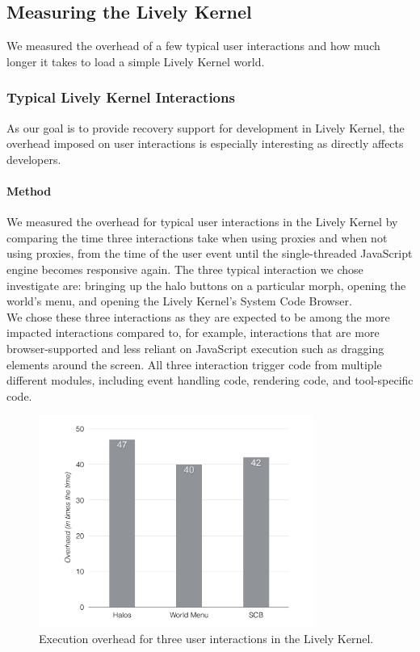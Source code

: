 \subsection{Measuring the Lively Kernel}

We measured the overhead of a few typical user interactions and how much longer it takes to load a simple Lively Kernel world.

\subsubsection{Typical Lively Kernel Interactions}

As our goal is to provide recovery support for development in Lively Kernel, the overhead imposed on user interactions is especially interesting as directly affects developers.

\paragraph{Method}
We measured the overhead for typical user interactions in the Lively Kernel by comparing the time three interactions take when using proxies and when not using proxies, from the time of the user event until the single-threaded JavaScript engine becomes responsive again.
The three typical interaction we chose investigate are: bringing up the halo buttons on a particular morph, opening the world's menu, and opening the Lively Kernel's System Code Browser.\\
We chose these three interactions as they are expected to be among the more impacted interactions compared to, for example, interactions that are more browser-supported and less reliant on JavaScript execution such as dragging elements around the screen.
All three interaction trigger code from multiple different modules, including event handling code, rendering code, and tool-specific code.

\begin{figure}[h]
    \centering
    \includegraphics[width=0.8\textwidth]{figures/6_evaluation/4_LivelyInteractionsOverhead.pdf}
    \caption{Execution overhead for three user interactions in the Lively Kernel.}
    \label{fig:LivelyInteractionsOverhead}
\end{figure}

